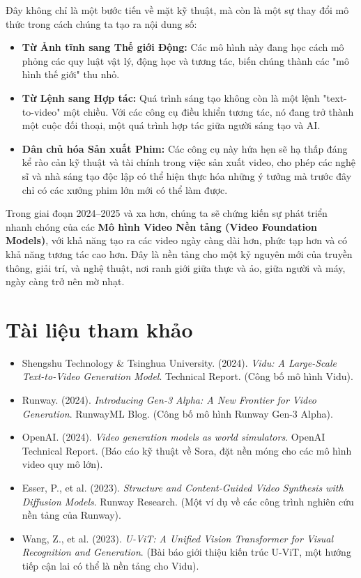 Đây không chỉ là một bước tiến về mặt kỹ thuật, mà còn là một sự thay đổi mô thức trong cách chúng ta tạo ra nội dung số:
\begin{itemize}
	\item \textbf{Từ Ảnh tĩnh sang Thế giới Động:} Các mô hình này đang học cách mô phỏng các quy luật vật lý, động học và tương tác, biến chúng thành các "mô hình thế giới" thu nhỏ.
	\item \textbf{Từ Lệnh sang Hợp tác:} Quá trình sáng tạo không còn là một lệnh "text-to-video" một chiều. Với các công cụ điều khiển tương tác, nó đang trở thành một cuộc đối thoại, một quá trình hợp tác giữa người sáng tạo và AI.
	\item \textbf{Dân chủ hóa Sản xuất Phim:} Các công cụ này hứa hẹn sẽ hạ thấp đáng kể rào cản kỹ thuật và tài chính trong việc sản xuất video, cho phép các nghệ sĩ và nhà sáng tạo độc lập có thể hiện thực hóa những ý tưởng mà trước đây chỉ có các xưởng phim lớn mới có thể làm được.
\end{itemize}
Trong giai đoạn 2024–2025 và xa hơn, chúng ta sẽ chứng kiến sự phát triển nhanh chóng của các \textbf{Mô hình Video Nền tảng (Video Foundation Models)}, với khả năng tạo ra các video ngày càng dài hơn, phức tạp hơn và có khả năng tương tác cao hơn. Đây là nền tảng cho một kỷ nguyên mới của truyền thông, giải trí, và nghệ thuật, nơi ranh giới giữa thực và ảo, giữa người và máy, ngày càng trở nên mờ nhạt.

\section*{Tài liệu tham khảo}
\begin{itemize}
	\item[1] Shengshu Technology \& Tsinghua University. (2024). \textit{Vidu: A Large-Scale Text-to-Video Generation Model}. Technical Report. (Công bố mô hình Vidu).
	\item[2] Runway. (2024). \textit{Introducing Gen-3 Alpha: A New Frontier for Video Generation}. RunwayML Blog. (Công bố mô hình Runway Gen-3 Alpha).
	\item[3] OpenAI. (2024). \textit{Video generation models as world simulators}. OpenAI Technical Report. (Báo cáo kỹ thuật về Sora, đặt nền móng cho các mô hình video quy mô lớn).
	\item[4] Esser, P., et al. (2023). \textit{Structure and Content-Guided Video Synthesis with Diffusion Models}. Runway Research. (Một ví dụ về các công trình nghiên cứu nền tảng của Runway).
	\item[5] Wang, Z., et al. (2023). \textit{U-ViT: A Unified Vision Transformer for Visual Recognition and Generation}. (Bài báo giới thiệu kiến trúc U-ViT, một hướng tiếp cận lai có thể là nền tảng cho Vidu).
\end{itemize}